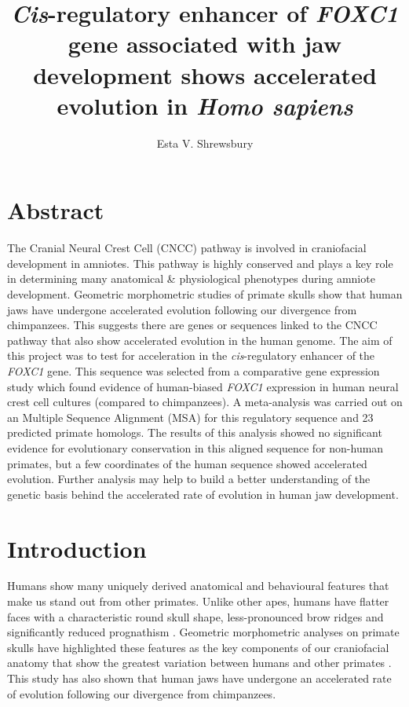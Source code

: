\documentclass{article}[12pt]
\title{\emph{Cis}-regulatory enhancer of \emph{FOXC1} gene associated with jaw development shows accelerated evolution in \emph{Homo sapiens}}
\author{Esta V. Shrewsbury}
\begin{document}
\maketitle

\section*{Abstract}

The Cranial Neural Crest Cell (CNCC) pathway is involved in craniofacial development in amniotes. This pathway is highly conserved and plays a key role in determining many anatomical \& physiological phenotypes during amniote development. Geometric morphometric studies of primate skulls show that human jaws have undergone accelerated evolution following our divergence from chimpanzees. This suggests there are genes or sequences linked to the CNCC pathway that also show accelerated evolution in the human genome. The aim of this project was to test for acceleration in the \emph{cis}-regulatory enhancer of the \emph{FOXC1} gene. This sequence was selected from a comparative gene expression study which found evidence of human-biased \emph{FOXC1} expression in human neural crest cell cultures (compared to chimpanzees). A meta-analysis was carried out on an Multiple Sequence Alignment (MSA) for this regulatory sequence and 23 predicted primate homologs. The results of this analysis showed no significant evidence for evolutionary conservation in this aligned sequence for non-human primates, but a few coordinates of the human sequence showed accelerated evolution. Further analysis may help to build a better understanding of the genetic basis behind the accelerated rate of evolution in human jaw development.
\newpage

\tableofcontents

\newpage

\printglossary

\newpage

\section*{Introduction}

Humans show many uniquely derived anatomical and behavioural features that make us stand out from other primates. Unlike other apes, humans have flatter faces with a characteristic round skull shape, less-pronounced brow ridges and significantly reduced prognathism \parencite{Martinez2009}. Geometric morphometric analyses on primate skulls have highlighted these features as the key components of our craniofacial anatomy that show the greatest variation between humans and other primates \parencite{Raia2018}. This study has also shown that human jaws have undergone an accelerated rate of evolution following our divergence from chimpanzees.
\end{document}
